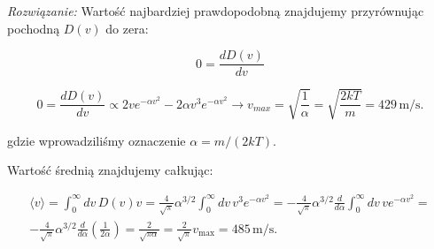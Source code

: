 \documentclass[11pt,a4paper]{article}
\begin{document}
\emph{Rozwiązanie:}
Wartość najbardziej prawdopodobną znajdujemy przyrównując pochodną $D(v)$ do zera:

$$
0=\frac{d D(v)}{d v}
$$

$$
0= \frac{d D(v)}{d v}  \propto 2 v e^{- \alpha v^2} - 2 \alpha v^3 e^{-\alpha v^2}  \longrightarrow v_{max} = \sqrt{\frac{1}{\alpha}} = \sqrt{\frac{2 k T}{m}} = 429\, \textrm{m}/\textrm{s}.
$$


gdzie wprowadziliśmy oznaczenie $\alpha = m/(2k T)$.

Wartość średnią znajdujemy całkując:

\begin{multline*}
\langle v \rangle = \int_{0}^\infty d v \, D(v) v = \frac{4}{\sqrt{\pi}} \alpha^{3/2} \int_0^\infty dv\, v^3 e^{-\alpha v^2} =
- \frac{4}{\sqrt{\pi}} \alpha^{3/2} \frac{d}{d \alpha} \int_0^\infty dv\, v e^{-\alpha v^2} =\\ - \frac{4}{\sqrt{\pi}} \alpha^{3/2} \frac{d}{d\alpha} \left(
\frac{1}{2\alpha}\right) = \frac{2 }{\sqrt{ \pi \alpha}} =  \frac{2}{\sqrt{\pi}} v_{\textrm{max}} = 485\, \textrm{m}/\textrm{s}.
\end{multline*}
\end{document}
